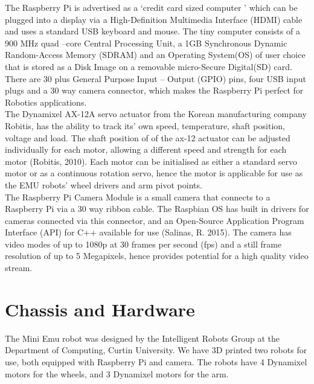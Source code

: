 \documentclass[titlepage,12pt,a4paper]{article}
\begin{document}
\noindent The Raspberry Pi is advertised as a ‘credit card sized computer ’ which can be plugged into a display via a High-Definition Multimedia Interface (HDMI) cable and uses a standard USB keyboard and mouse. The tiny computer consists of a 900 MHz quad –core Central Processing Unit, a 1GB Synchronous Dynamic Random-Access Memory (SDRAM) and an Operating System(OS) of user choice that is stored as a Disk Image on a removable micro-Secure Digital(SD) card. There are 30 plus General Purpose Input – Output (GPIO) pins, four USB input plugs and a 30 way camera connector, which makes the Raspberry Pi perfect for Robotics applications.\\

\noindent The Dynamixel AX-12A servo actuator from the Korean manufacturing company Robitis, has the ability to track its’ own speed, temperature, shaft position, voltage and load. The shaft position of of the ax-12 actuator can be adjusted individually for each motor, allowing a different speed and strength for each motor (Robitis, 2010). Each motor can be initialised as either a standard servo motor or as a continuous rotation servo, hence the motor is applicable for use as the EMU robots’ wheel drivers and arm pivot points.\\

\noindent The Raspberry Pi Camera Module is a small camera that connects to a Raspberry Pi via a 30 way ribbon cable. The Raspbian OS has built in drivers for cameras connected via this connector, and an Open-Source Application Program Interface (API) for C++ available for use (Salinas, R. 2015).  The camera has video modes of up to 1080p at 30 frames per second (fps) and a still frame resolution of up to 5 Megapixels, hence provides potential for a high quality video stream.\\

\section{Chassis and Hardware}
The Mini Emu robot was designed by the Intelligent Robots Group at the Department of Computing, Curtin University. We have 3D printed two robots for use, both equipped with Raspberry Pi and camera. The robots have 4 Dynamixel motors for the wheels, and 3 Dynamixel motors for the arm.
\end{document}
